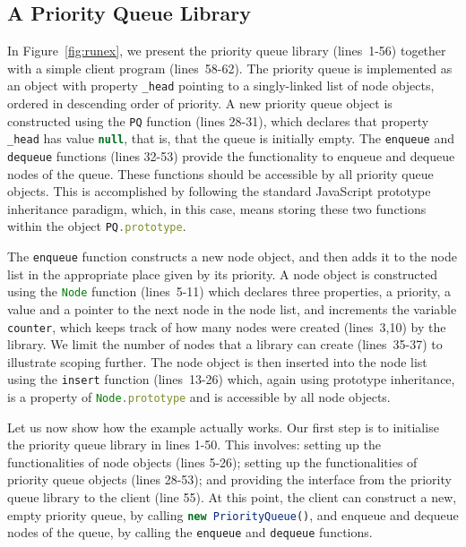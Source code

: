 \documentclass{llncs}
\def\jsinline{\lstinline[language=JavaScript, basicstyle=\small]}
\begin{document}
\subsection*{A Priority Queue Library}
In Figure~\ref{fig:runex}, we present the priority queue library
(lines~1-56)  together with a simple
client program (lines~58-62). 
The priority queue is implemented as an object with
property \jsinline|_head| pointing 
to a singly-linked list of node
objects, ordered in descending order of priority.
A new priority queue object is constructed using the 
\jsinline|PQ| function (lines 28-31), 
which declares that 
property \jsinline|_head|  has  value \jsinline|null|, 
that is, that the queue is initially empty.
The \jsinline|enqueue|
and \jsinline|dequeue| functions (lines 32-53) provide the
functionality to enqueue and dequeue nodes of the queue. These functions 
should be accessible by all priority queue objects.
This is accomplished by following the standard JavaScript
prototype inheritance paradigm,
which, in this case, means storing these two functions within the object \jsinline|PQ.prototype|. 

The \jsinline|enqueue| function constructs a new node object,  and
then adds
it to the node list in the appropriate place given by its priority. A
node object is constructed using the 
\jsinline|Node| function  (lines~5-11) which declares three
properties, a priority, a
value  and a pointer to the
next node in the node list, and increments the variable \jsinline|counter|,
which keeps track of how many nodes were created
(lines~3,10) by the library. 
We limit the number of nodes that a library can create (lines~35-37) to illustrate scoping further.
The node object is then inserted into the node list 
using the \jsinline|insert| function
(lines~13-26)  which, again using prototype inheritance, 
is a property of \jsinline|Node.prototype| and
is accessible by all node objects. 



Let us now show how the example actually works. Our first step is to
initialise the priority queue library in  lines 1-50. This involves:
 setting up the functionalities of node objects (lines 5-26);
 setting up the functionalities of priority queue objects
(lines 28-53); and  providing the interface from the priority
queue library to the client (line 55). At this point, the client can 
construct a new, empty priority queue, by calling \jsinline|new PriorityQueue()|,
and enqueue and dequeue nodes of the queue, 
by calling the \jsinline|enqueue| and \jsinline|dequeue| functions.
\end{document}
